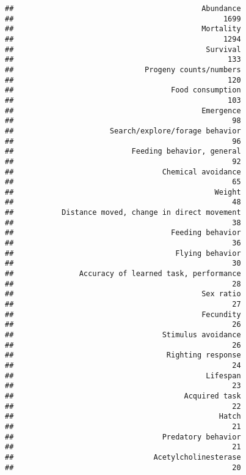 \documentclass[]{article}
\begin{document}
\begin{verbatim}
##                                           Abundance 
##                                                1699 
##                                           Mortality 
##                                                1294 
##                                            Survival 
##                                                 133 
##                              Progeny counts/numbers 
##                                                 120 
##                                    Food consumption 
##                                                 103 
##                                           Emergence 
##                                                  98 
##                      Search/explore/forage behavior 
##                                                  96 
##                           Feeding behavior, general 
##                                                  92 
##                                  Chemical avoidance 
##                                                  65 
##                                              Weight 
##                                                  48 
##           Distance moved, change in direct movement 
##                                                  38 
##                                    Feeding behavior 
##                                                  36 
##                                     Flying behavior 
##                                                  30 
##               Accuracy of learned task, performance 
##                                                  28 
##                                           Sex ratio 
##                                                  27 
##                                           Fecundity 
##                                                  26 
##                                  Stimulus avoidance 
##                                                  26 
##                                   Righting response 
##                                                  24 
##                                            Lifespan 
##                                                  23 
##                                       Acquired task 
##                                                  22 
##                                               Hatch 
##                                                  21 
##                                  Predatory behavior 
##                                                  21 
##                                Acetylcholinesterase 
##                                                  20 

\end{verbatim}
\end{document}
